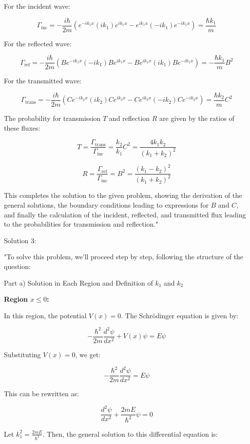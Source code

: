 For the incident wave:

\[
\Gamma_{\text{inc}} = -\frac{i\hbar}{2m} \left(e^{-ik_1x}(ik_1)e^{ik_1x} - e^{ik_1x}(-ik_1)e^{-ik_1x}\right) = \frac{\hbar k_1}{m}
\]

For the reflected wave:

\[
\Gamma_{\text{ref}} = -\frac{i\hbar}{2m} \left(Be^{-ik_1x}(-ik_1)Be^{ik_1x} - Be^{ik_1x}(ik_1)Be^{-ik_1x}\right) = -\frac{\hbar k_1}{m}B^2
\]

For the transmitted wave:

\[
\Gamma_{\text{trans}} = -\frac{i\hbar}{2m} \left(Ce^{-ik_2x}(ik_2)Ce^{ik_2x} - Ce^{ik_2x}(-ik_2)Ce^{-ik_2x}\right) = \frac{\hbar k_2}{m}C^2
\]

The probability for transmission \(T\) and reflection \(R\) are given by the ratios of these fluxes:

\[
T = \frac{\Gamma_{\text{trans}}}{\Gamma_{\text{inc}}} = \frac{k_2}{k_1}C^2 = \frac{4k_1k_2}{(k_1+k_2)^2}
\]

\[
R = \frac{\Gamma_{\text{ref}}}{\Gamma_{\text{inc}}} = B^2 = \frac{(k_1-k_2)^2}{(k_1+k_2)^2}
\]

This completes the solution to the given problem, showing the derivation of the general solutions, the boundary conditions leading to expressions for \(B\) and \(C\), and finally the calculation of the incident, reflected, and transmitted flux leading to the probabilities for transmission and reflection."

Solution 3:

"To solve this problem, we'll proceed step by step, following the structure of the question:

Part a) Solution in Each Region and Definition of \(k_1\) and \(k_2\)

\textbf{Region \(x \leq 0\):}

In this region, the potential \(V(x) = 0\). The Schrödinger equation is given by:

\[
-\frac{\hbar^2}{2m} \frac{d^2\psi}{dx^2} + V(x)\psi = E\psi
\]

Substituting \(V(x) = 0\), we get:

\[
-\frac{\hbar^2}{2m} \frac{d^2\psi}{dx^2} = E\psi
\]

This can be rewritten as:

\[
\frac{d^2\psi}{dx^2} + \frac{2mE}{\hbar^2}\psi = 0
\]

Let \(k_1^2 = \frac{2mE}{\hbar^2}\). Then, the general solution to this differential equation is:

